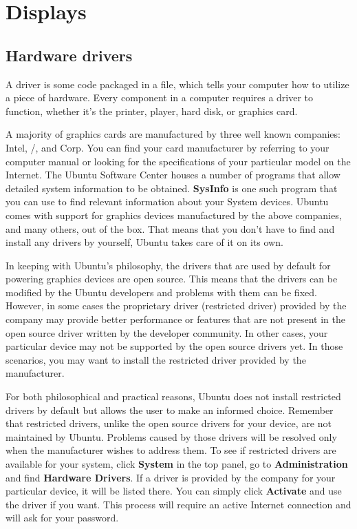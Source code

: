 \section{Displays}
\subsection{Hardware drivers}

A driver is some code packaged in a file, which tells your computer how to utilize a piece of hardware. Every component in a computer requires a driver to function, whether it's the printer,  player, hard disk, or graphics card. 

A majority of graphics cards are manufactured by three well known companies: Intel, /, and  Corp. You can find your card manufacturer by referring to your computer manual or looking for the specifications of your particular model on the Internet. The Ubuntu Software Center houses a number of programs that allow detailed system information to be obtained. \textbf{SysInfo} is one such program that you can use to find relevant information about your System devices. Ubuntu comes with support for graphics devices manufactured by the above companies, and many others, out of the box. That means that you don't have to find and install any drivers by yourself, Ubuntu takes care of it on its own.

In keeping with Ubuntu's philosophy, the drivers that are used by default for powering graphics devices are open source. This means that the drivers can be modified by the Ubuntu developers and problems with them can be fixed. However, in some cases the proprietary driver (restricted driver) provided by the company may provide better performance or features that are not present in the open source driver written by the developer community. In other cases, your particular device may not be supported by the open source drivers yet. In those scenarios, you may want to install the restricted driver provided by the manufacturer.

For both philosophical and practical reasons, Ubuntu does not install restricted drivers by default but allows the user to make an informed choice. Remember that restricted drivers, unlike the open source drivers for your device, are not maintained by Ubuntu. Problems caused by those drivers will be resolved only when the manufacturer wishes to address them. To see if restricted drivers are available for your system, click \textbf{System} in the top panel, go to \textbf{Administration} and find \textbf{Hardware Drivers}. If a driver is provided by the company for your particular device, it will be listed there. You can simply click \textbf{Activate} and use the driver if you want. This process will require an active Internet connection and will ask for your password.

